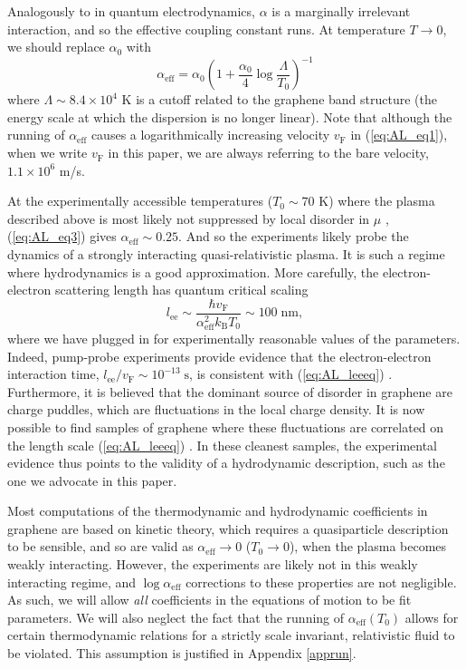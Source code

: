 Analogously to in quantum electrodynamics, $\alpha$ is a marginally irrelevant interaction, and so the effective coupling constant runs.   At temperature $T\rightarrow 0$, we should replace $\alpha_0$ with \cite{sheehy_quantum_2007} \begin{equation}
\alpha_{\mathrm{eff}} = \alpha_0 \left(1+\frac{\alpha_0}{4}\log\frac{\Lambda}{T_0}\right)^{-1} \label{eq:AL_eq3}
\end{equation}
where $\Lambda \sim 8.4\times 10^4$ K is a cutoff related to the graphene band structure (the energy scale at which the dispersion is no longer linear).  Note that although the running of $\alpha_{\mathrm{eff}}$ causes a logarithmically increasing velocity $v_{\mathrm{F}}$ in (\ref{eq:AL_eq1}), when we write $v_{\mathrm{F}}$ in this paper, we are always referring to the bare velocity, $1.1\times 10^6$ m/s.    

At the experimentally accessible temperatures ($T_0\sim 70$ K) where the plasma described above is most likely not suppressed by local disorder in $\mu$ \cite{crossno_observation_2016},  (\ref{eq:AL_eq3}) gives $\alpha_{\mathrm{eff}} \sim 0.25$.    And so the experiments likely probe the dynamics of a strongly interacting quasi-relativistic plasma.   It is such a regime where hydrodynamics is a good approximation.   More carefully, the electron-electron scattering length has quantum critical scaling \cite{muller_quantum-critical_2008} \begin{equation}
l_{\mathrm{ee}} \sim \frac{\hbar v_{\mathrm{F}}}{\alpha_{\mathrm{eff}}^2 k_{\mathrm{B}}T_0} \sim 100 \; \mathrm{nm},  \label{eq:AL_leeeq}
\end{equation}
where we have plugged in for experimentally reasonable values of the parameters.   Indeed, pump-probe experiments provide evidence that the electron-electron interaction time,  $l_{\mathrm{ee}}/v_{\mathrm{F}} \sim 10^{-13} \; \mathrm{s}$, is consistent with (\ref{eq:AL_leeeq}) \cite{breusing_ultrafast_2009, johannsen_direct_2013}.   Furthermore, it is believed that the dominant source of disorder in graphene are charge puddles, which are fluctuations in the local charge density.   It is now possible to find samples of graphene where these fluctuations are correlated on the length scale (\ref{eq:AL_leeeq}) \cite{xue_scanning_2011}.   In these cleanest samples, the experimental evidence thus points to the validity of a hydrodynamic description, such as the one we advocate in this paper.


Most computations of the thermodynamic and hydrodynamic coefficients in graphene are based on kinetic theory, which requires a quasiparticle description to be sensible, and so are valid as $\alpha_{\mathrm{eff}} \rightarrow 0$ ($T_0\rightarrow 0$), when the plasma becomes weakly interacting.   However, the experiments are likely not in this weakly interacting regime, and $\log \alpha_{\mathrm{eff}}$ corrections to these properties are not negligible.   As such, we will allow \emph{all} coefficients in the equations of motion to be fit parameters.    We will also neglect the fact that the running of $\alpha_{\mathrm{eff}}(T_0)$ allows for certain thermodynamic relations for a strictly scale invariant, relativistic fluid to be violated.   This assumption is justified in Appendix \ref{apprun}.

